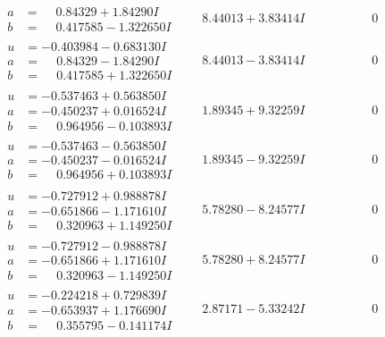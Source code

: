 \documentclass[1p]{elsarticle_modified}
\theoremstyle{definition}
\begin{document}
$$\begin{array}{c|c|c}
\begin{aligned}
a &= \phantom{-}0.84329 + 1.84290 I \\
b &= \phantom{-}0.417585 - 1.322650 I\end{aligned}
 & \phantom{-}8.44013 + 3.83414 I & \phantom{-0.000000 } 0 \\ \hline\begin{aligned}
u &= -0.403984 - 0.683130 I \\
a &= \phantom{-}0.84329 - 1.84290 I \\
b &= \phantom{-}0.417585 + 1.322650 I\end{aligned}
 & \phantom{-}8.44013 - 3.83414 I & \phantom{-0.000000 } 0 \\ \hline\begin{aligned}
u &= -0.537463 + 0.563850 I \\
a &= -0.450237 + 0.016524 I \\
b &= \phantom{-}0.964956 - 0.103893 I\end{aligned}
 & \phantom{-}1.89345 + 9.32259 I & \phantom{-0.000000 } 0 \\ \hline\begin{aligned}
u &= -0.537463 - 0.563850 I \\
a &= -0.450237 - 0.016524 I \\
b &= \phantom{-}0.964956 + 0.103893 I\end{aligned}
 & \phantom{-}1.89345 - 9.32259 I & \phantom{-0.000000 } 0 \\ \hline\begin{aligned}
u &= -0.727912 + 0.988878 I \\
a &= -0.651866 - 1.171610 I \\
b &= \phantom{-}0.320963 + 1.149250 I\end{aligned}
 & \phantom{-}5.78280 - 8.24577 I & \phantom{-0.000000 } 0 \\ \hline\begin{aligned}
u &= -0.727912 - 0.988878 I \\
a &= -0.651866 + 1.171610 I \\
b &= \phantom{-}0.320963 - 1.149250 I\end{aligned}
 & \phantom{-}5.78280 + 8.24577 I & \phantom{-0.000000 } 0 \\ \hline\begin{aligned}
u &= -0.224218 + 0.729839 I \\
a &= -0.653937 + 1.176690 I \\
b &= \phantom{-}0.355795 - 0.141174 I\end{aligned}
 & \phantom{-}2.87171 - 5.33242 I & \phantom{-0.000000 } 0 \\ \hline\begin{aligned}

\end{aligned}
\end{array}$$
\end{document}
